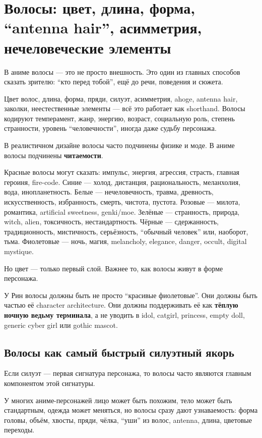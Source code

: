 \section{Волосы: цвет, длина, форма, “antenna hair”, асимметрия, нечеловеческие элементы}

В аниме волосы --- это не просто внешность. Это один из главных способов
сказать зрителю: ``кто перед тобой'', ещё до речи, поведения и сюжета.

Цвет волос, длина, форма, пряди, силуэт, асимметрия, ahoge, antenna
hair, заколки, неестественные элементы --- всё это работает как
shorthand. Волосы кодируют темперамент, жанр, энергию, возраст,
социальную роль, степень странности, уровень ``человечности'', иногда
даже судьбу персонажа.

В реалистичном дизайне волосы часто подчинены физике и моде. В аниме
волосы подчинены \textbf{читаемости}.

Красные волосы могут сказать: импульс, энергия, агрессия, страсть,
главная героиня, fire-code. Синие --- холод, дистанция, рациональность,
меланхолия, вода, инопланетность. Белые --- нечеловечность, травма,
древность, искусственность, избранность, смерть, чистота, пустота.
Розовые --- милота, романтика, artificial sweetness, genki/\hspace{0pt}moe. Зелёные
--- странность, природа, witch, alien, токсичность, нестандартность.
Чёрные --- сдержанность, традиционность, мистичность, серьёзность,
``обычный человек'' или, наоборот, тьма. Фиолетовые --- ночь, магия,
melancholy, elegance, danger, occult, digital mystique.

Но цвет --- только первый слой. Важнее то, как волосы живут в форме
персонажа.

У Рин волосы должны быть не просто ``красивые фиолетовые''. Они должны
быть частью её character architecture. Они должны поддерживать её как
\textbf{тёплую ночную ведьму терминала}, а не уводить в idol, catgirl,
princess, empty doll, generic cyber girl или gothic mascot.

\subsection*{Волосы как самый быстрый силуэтный якорь}

Если силуэт --- первая сигнатура персонажа, то волосы часто являются
главным компонентом этой сигнатуры.

У многих аниме-персонажей лицо может быть похожим, тело может быть
стандартным, одежда может меняться, но волосы сразу дают узнаваемость:
форма головы, объём, хвосты, пряди, чёлка, ``уши'' из волос, antenna,
длина, цветовые переходы.

